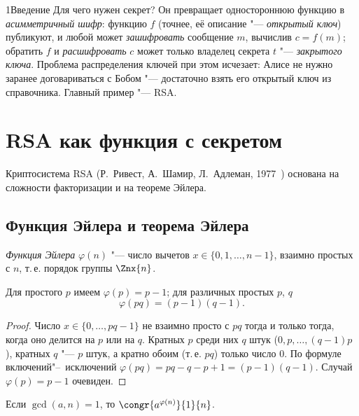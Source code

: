 \begin{lecture}{1}{Введение}
Для чего нужен секрет? Он превращает одностороннюю функцию в \emph{асимметричный шифр}:
функцию $f$ (точнее, её описание "--- \emph{открытый ключ}) публикуют, и любой может
\emph{зашифровать} сообщение $m$, вычислив $c = f(m)$; обратить $f$ и \emph{расшифровать}
$c$ может только владелец секрета $t$ "--- \emph{закрытого ключа}. Проблема распределения
ключей при этом исчезает: Алисе не нужно заранее договариваться с Бобом "--- достаточно взять
его открытый ключ из справочника. Главный пример "--- RSA.


\section{RSA как функция с секретом}\label{l1:rsa}

Криптосистема RSA (Р.~Ривест, А.~Шамир, Л.~Адлеман, 1977~\cite{rsa}) основана на сложности
факторизации и на теореме Эйлера.

\subsection{Функция Эйлера и теорема Эйлера}

\begin{definition}
\emph{Функция Эйлера} $\varphi(n)$ "--- число вычетов $x \in \{0, 1, \dots, n - 1\}$,
взаимно простых с $n$, т.\,е. порядок группы $\Znx{n}$.
\end{definition}

\begin{lemma}\label{l1:phi-pq}
Для простого $p$ имеем $\varphi(p) = p - 1$; для различных простых $p$, $q$
\[
  \varphi(pq) = (p - 1)(q - 1).
\]
\end{lemma}

\begin{proof}
Число $x \in \{0, \dots, pq - 1\}$ не взаимно просто с $pq$ тогда и только тогда, когда оно
делится на $p$ или на $q$. Кратных $p$ среди них $q$ штук ($0, p, \dots, (q-1)p$), кратных
$q$ "--- $p$ штук, а кратно обоим (т.\,е. $pq$) только число $0$. По формуле
включений"--~исключений
$\varphi(pq) = pq - q - p + 1 = (p - 1)(q - 1)$. Случай $\varphi(p) = p - 1$ очевиден.
\end{proof}

\begin{theorem}[Эйлер]\label{l1:euler}
Если $\gcd(a, n) = 1$, то $\congr{a^{\varphi(n)}}{1}{n}$.
\end{theorem}


\end{lecture}

